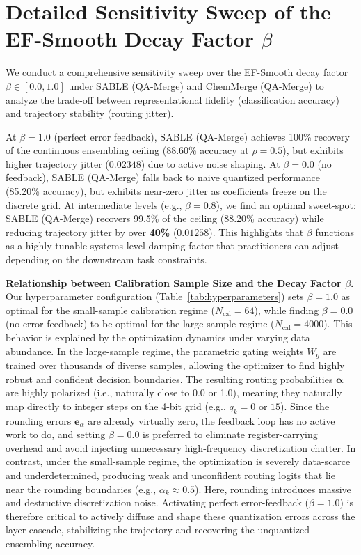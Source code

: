 \documentclass{article}
\theoremstyle{plain}
\theoremstyle{definition}
\theoremstyle{remark}
\begin{document}
\section{Detailed Sensitivity Sweep of the EF-Smooth Decay Factor $\beta$}
\label{app:beta_sweep_detail}
We conduct a comprehensive sensitivity sweep over the EF-Smooth decay factor $\beta \in [0.0, 1.0]$ under SABLE (QA-Merge) and ChemMerge (QA-Merge) to analyze the trade-off between representational fidelity (classification accuracy) and trajectory stability (routing jitter).

At $\beta = 1.0$ (perfect error feedback), SABLE (QA-Merge) achieves 100\% recovery of the continuous ensembling ceiling (88.60\% accuracy at $\rho=0.5$), but exhibits higher trajectory jitter ($0.02348$) due to active noise shaping. At $\beta = 0.0$ (no feedback), SABLE (QA-Merge) falls back to naive quantized performance (85.20\% accuracy), but exhibits near-zero jitter as coefficients freeze on the discrete grid. At intermediate levels (e.g., $\beta = 0.8$), we find an optimal sweet-spot: SABLE (QA-Merge) recovers 99.5\% of the ceiling (88.20\% accuracy) while reducing trajectory jitter by over \textbf{40\%} ($0.01258$). This highlights that $\beta$ functions as a highly tunable systems-level damping factor that practitioners can adjust depending on the downstream task constraints.

\textbf{Relationship between Calibration Sample Size and the Decay Factor $\beta$.} Our hyperparameter configuration (Table~\ref{tab:hyperparameters}) sets $\beta = 1.0$ as optimal for the small-sample calibration regime ($N_{\text{cal}}=64$), while finding $\beta = 0.0$ (no error feedback) to be optimal for the large-sample regime ($N_{\text{cal}}=4000$). This behavior is explained by the optimization dynamics under varying data abundance. In the large-sample regime, the parametric gating weights $W_g$ are trained over thousands of diverse samples, allowing the optimizer to find highly robust and confident decision boundaries. The resulting routing probabilities $\boldsymbol{\alpha}$ are highly polarized (i.e., naturally close to 0.0 or 1.0), meaning they naturally map directly to integer steps on the 4-bit grid (e.g., $q_k = 0$ or $15$). Since the rounding errors $\mathbf{e}_{\alpha}$ are already virtually zero, the feedback loop has no active work to do, and setting $\beta = 0.0$ is preferred to eliminate register-carrying overhead and avoid injecting unnecessary high-frequency discretization chatter. In contrast, under the small-sample regime, the optimization is severely data-scarce and underdetermined, producing weak and unconfident routing logits that lie near the rounding boundaries (e.g., $\alpha_k \approx 0.5$). Here, rounding introduces massive and destructive discretization noise. Activating perfect error-feedback ($\beta = 1.0$) is therefore critical to actively diffuse and shape these quantization errors across the layer cascade, stabilizing the trajectory and recovering the unquantized ensembling accuracy.
\end{document}
